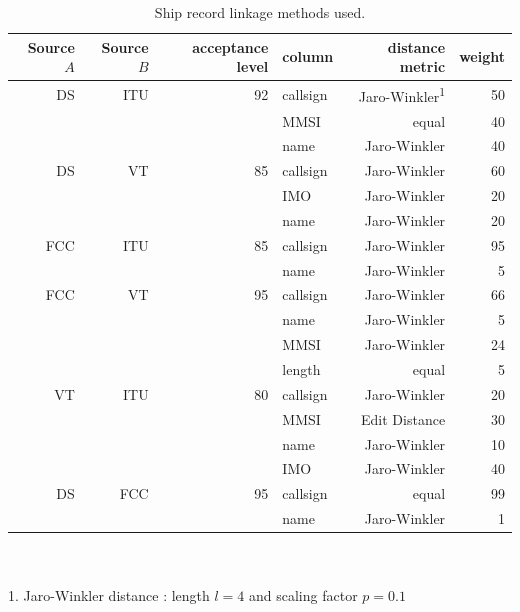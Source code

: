 \begin{table}[htbp]
  \caption[Ship record linkage methods]{Ship record linkage methods used.}
  \ssp
  \renewcommand{\arraystretch}{1.4}
  \begin{tabular}{rrrlrr}
    \hline
    Source $A$ & Source $B$ & acceptance level & column & distance metric & weight \\
    \hline
     DS & ITU & 92 & callsign & Jaro-Winkler\textsuperscript{1} & 50 \\
        &     &    & MMSI & equal & 40 \\
        &     &    & name & Jaro-Winkler & 40 \\
    \hline
     DS &  VT & 85 & callsign & Jaro-Winkler & 60 \\
        &     &    & IMO & Jaro-Winkler & 20 \\
        &     &    & name & Jaro-Winkler & 20 \\
    \hline
    FCC & ITU & 85 & callsign & Jaro-Winkler & 95 \\
        &     &    & name & Jaro-Winkler & 5 \\
    \hline
    FCC &  VT & 95 & callsign & Jaro-Winkler & 66 \\
        &     &    & name & Jaro-Winkler & 5 \\
        &     &    & MMSI & Jaro-Winkler & 24 \\
        &     &    & length & equal & 5 \\
    \hline
     VT & ITU & 80 & callsign & Jaro-Winkler & 20 \\
        &     &    & MMSI & Edit Distance & 30 \\
        &     &    & name & Jaro-Winkler & 10 \\
        &     &    & IMO & Jaro-Winkler & 40 \\
    \hline
     DS & FCC & 95 & callsign & equal & 99 \\
        &     &    & name & Jaro-Winkler& 1 \\
  \end{tabular}
  \\
  \\
  1. Jaro-Winkler distance \citep{winkler1990string}: length $l = 4$ and scaling factor $p = 0.1$
  \label{table:ships-record-linkage-methods}
\end{table}


